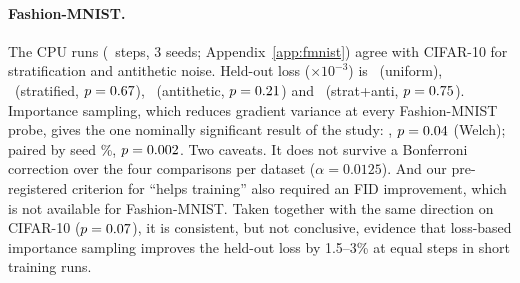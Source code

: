 \paragraph{Fashion-MNIST.} The CPU runs (\FSteps\ steps, 3 seeds; Appendix~\ref{app:fmnist}) agree with
CIFAR-10 for stratification and antithetic noise. Held-out loss ($\times10^{-3}$) is \FUnifHO\ (uniform),
\FStratHO\ (stratified, $p=0.67$), \FAntiHO\ (antithetic, $p=0.21$) and \FSAHO\ (strat+anti,
$p=0.75$). Importance sampling, which reduces gradient variance at every Fashion-MNIST probe, gives the one
nominally significant result of the study: \FImpHO, $p=0.04$ (Welch); paired by seed
\FImpHOpair\%, $p=0.002$. Two caveats. It does not survive a Bonferroni correction over the four
comparisons per dataset ($\alpha=0.0125$). And our pre-registered criterion for ``helps training'' also
required an FID improvement, which is not available for Fashion-MNIST. Taken together with the same direction
on CIFAR-10 ($p=0.07$), it is consistent, but not conclusive, evidence that loss-based importance sampling
improves the held-out loss by 1.5--3\% at equal steps in short training runs.
